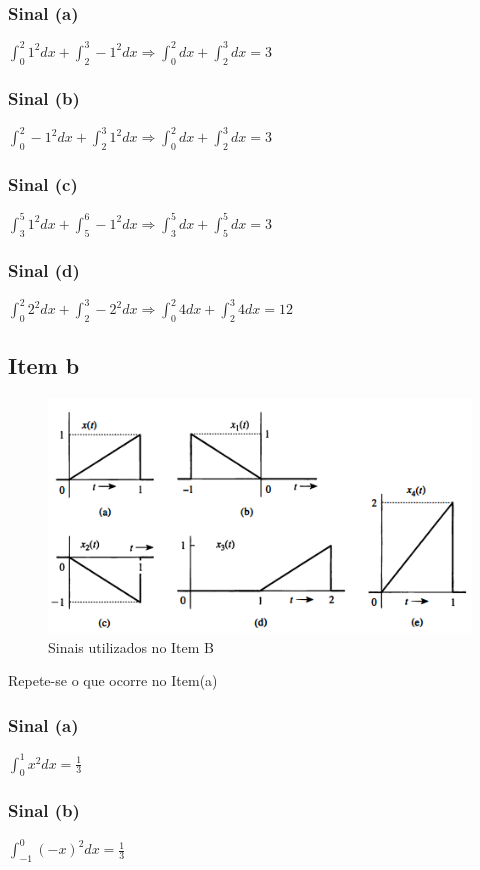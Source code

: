 \documentclass[a4paper, 12pt]{article}
\begin{document}
			\subsubsection{Sinal (a)}
			$\int_{0}^{2} 1^{2}dx + \int_{2}^{3} -1^{2}dx \Rightarrow  \int_{0}^{2}dx + \int_{2}^{3}dx = 3$ 
			\subsubsection{Sinal (b)}
			$\int_{0}^{2} -1^{2}dx + \int_{2}^{3} 1^{2}dx \Rightarrow  \int_{0}^{2}dx + \int_{2}^{3}dx = 3$ 	
			\subsubsection{Sinal (c)}
			$\int_{3}^{5} 1^{2}dx + \int_{5}^{6} -1^{2}dx \Rightarrow  \int_{3}^{5}dx + \int_{5}^{5}dx = 3$ 		
			\subsubsection{Sinal (d)}
			$\int_{0}^{2} 2^{2}dx + \int_{2}^{3} -2^{2}dx \Rightarrow  \int_{0}^{2}4dx + \int_{2}^{3}4dx = 12$ 	
			\newpage	
		\subsection{Item b}	
			\begin{figure}[!ht]
				\centering
				\includegraphics{img/Figura2.png}
				\caption{Sinais utilizados no Item B}	
			\end{figure}		
			Repete-se o que ocorre no Item(a)
			\subsubsection{Sinal (a)}
			$\int_{0}^{1} x^{2}dx  = \frac{1}{3}$
			\subsubsection{Sinal (b)}
			$\int_{-1}^{0} (-x)^{2}dx  = \frac{1}{3}$ 
\end{document}
